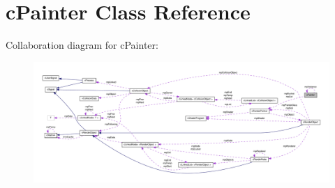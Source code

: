 \hypertarget{classc_painter}{
\section{cPainter Class Reference}
\label{classc_painter}
}


Collaboration diagram for cPainter:
\nopagebreak
\begin{figure}[H]
\begin{center}
\leavevmode
\includegraphics[width=400pt]{classc_painter__coll__graph}
\end{center}
\end{figure}

